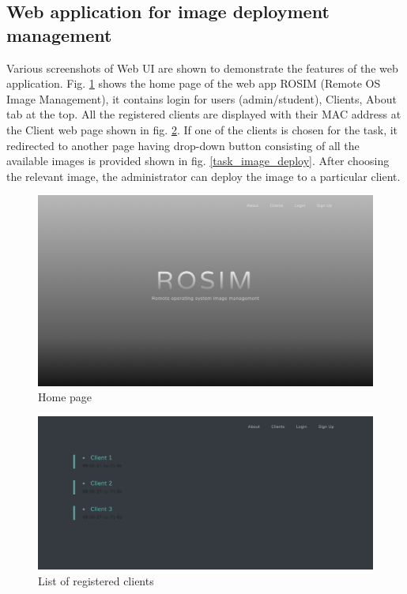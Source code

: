 \documentclass[a4paper,12pt]{article}
\begin{document}
\subsection{ Web application for image deployment management }
Various screenshots of Web UI are shown to demonstrate the features of the web application. Fig. \ref{home_page} shows the home page of the web app ROSIM (Remote OS Image Management), it contains login for users (admin/student), Clients, About tab at the top. All the registered clients are displayed with their MAC address at the Client web page shown in fig. \ref{reg_clients}. If one of the clients is chosen for the task, it redirected to another page having drop-down button consisting of all the available images is provided shown in fig. \ref{task_image_deploy}. After choosing the relevant image, the administrator can deploy the image to a particular client.
\begin{figure}[h!]
    \centering
    \includegraphics[width=\linewidth]{webapp1.png}
    \caption{Home page}
    \label{home_page}
\end{figure}
\begin{figure}[h!]
    \centering
    \includegraphics[width=\linewidth]{webapp2.png}
    \caption{List of registered clients}
    \label{reg_clients}
\end{figure}
\end{document}
